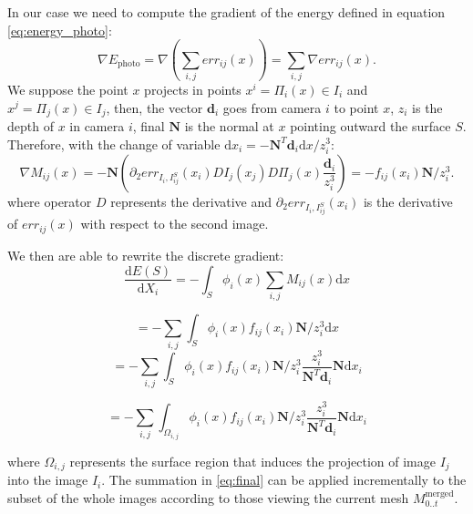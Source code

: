 In our case we need to compute the gradient of the energy defined in equation \eqref{eq:energy_photo}:
\begin{equation}
  \nabla E_{\textrm{photo}} = \nabla (\sum_{i,j} err_{ij}(x)) = \sum_{i,j} \nabla err_{ij}(x).
\end{equation}
We suppose the point $x$ projects in points $x^i = \Pi_i(x) \in I_i$ and  $x^j = \Pi_j(x) \in I_j$, then, the vector $\mathbf{d}_i$ goes from camera $i$ to point $x$, $z_i$ is the depth of $x$ in camera $i$, final $\mathbf{N}$ is the normal at $x$ pointing outward the surface $\mathit{S}$. 
Therefore, with the change of variable $\textrm{d}x_i = -\mathbf{N}^T \mathbf{d}_i \textrm{d}x/z_i^3$:
\begin{equation}
  \nabla \mathit{M}_{ij}(x) = -\mathbf{N} \left( \partial_2 err_{I_i, I_{ij}^{\mathit{S}}}(x_i) DI_j(x_j) D\Pi_j(x)\frac{\mathbf{d}_i}{z_i^3}\right) = - f_{ij}(x_i) \mathbf{N}/z_i^3.
\end{equation}
where operator $D$ represents the derivative and $\partial_2 err_{I_i, I_{ij}^{\mathit{S}}}(x_i)$ is the derivative of $err_{ij}(x)$ with respect to the second image.


We then are able to rewrite the discrete gradient:
\begin{equation}
  \frac{\textrm{d}E(\mathit{S})}{\textrm{d}X_i} =  - \int_{\mathit{S}} \phi_i(x) \sum_{i,j} \mathit{M}_{ij}(x) \textrm{d}x 
\end{equation}

\begin{equation}
  =  - \sum_{i,j} \int_{\mathit{S}} \phi_i(x)  f_{ij}(x_i)  \mathbf{N}/z_i^3 \textrm{d}x 
\end{equation}
\begin{equation}
  =  - \sum_{i,j} \int_{\mathit{S}} \phi_i(x)  f_{ij}(x_i)  \mathbf{N}/z_i^3 \frac{z_i^3}{\mathbf{N}^T \mathbf{d}_i }\mathbf{N} \textrm{d}x_i
\end{equation}

\begin{equation}
\label{eq:final}
  =  - \sum_{i,j} \int_{\mathit{\Omega_{i,j}}} \phi_i(x)  f_{ij}(x_i)  \mathbf{N}/z_i^3 \frac{z_i^3}{\mathbf{N}^T \mathbf{d}_i }\mathbf{N} \textrm{d}x_i
\end{equation}

where $\Omega_{i,j}$ represents the surface region that induces the projection of image $I_j$ into the image $I_i$.
The summation in \eqref{eq:final} can be applied incrementally to the subset of the whole images according to those viewing the current mesh $M_{0..t}^{\text{merged}}$.


